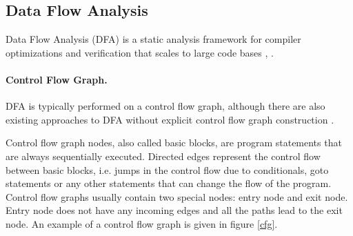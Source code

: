         \subsection{Data Flow Analysis}
        Data Flow Analysis (DFA) is a static analysis framework 
        for compiler optimizations and verification that 
        scales to large code bases 
        \cite{nielson1999principles}, \cite{aho1985compilers}.
        
        \paragraph{Control Flow Graph.} 
        DFA is typically performed on a control flow graph, 
        although there are also existing approaches to DFA 
        without explicit control flow graph 
        construction \cite{mohnen2002graph}.
        
        Control flow graph nodes, also called basic blocks, 
        are program statements that are always sequentially executed. 
        Directed edges represent the control flow between basic blocks, 
        i.e. jumps in the control flow due to conditionals, 
        goto statements or any other statements that can change 
        the flow of the program.        
        Control flow graphs usually contain two special nodes: 
        entry node and exit node. Entry node does not have any 
        incoming edges and all the paths lead to the exit node.        
        An example of a control flow graph is given in figure \ref{cfg}.
        
